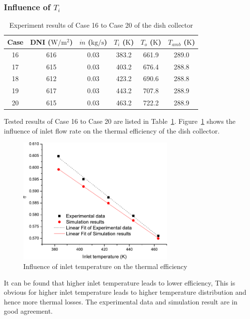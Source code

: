 \subsubsection{Influence of $T_i$}

\begin{table}[htbp]\footnotesize
	\caption{Experiment results of Case 16 to Case 20 of the dish collector}
	\begin{center}
	\begin{tabular}{cccccc}
		\toprule
		Case	& DNI ($\mathrm{W/m^2}$)	&	$\dot{m}$ ($\mathrm{kg/s}$)			&	$T_i$ ($\mathrm{K}$)	&	$T_o$ ($\mathrm{K}$)		&	$T_{amb}$ ($\mathrm{K}$)\\
		\midrule
		16	&	616	&	0.03	&	383.2	&	661.9	&	289.0\\
		17	&	615	&	0.03	&	403.2	&	676.4	&	288.8\\
		18	&	612	&	0.03	&	423.2	&	690.6	&	288.8	\\
		19	&	617	&	0.03	&	443.2	&	707.8	&	288.9\\
		20	&	615	&	0.03	&	463.2	&	722.2	&	288.9\\
		\bottomrule
	\end{tabular}
	\end{center}
	\label{tab:ResultOfDish3}
\end{table}
Tested results of Case 16 to Case 20 are listed in Table~\ref{tab:ResultOfDish3}.
Figure~\ref{fig:T_i-eta-dish} shows the influence of inlet flow rate on the thermal efficiency of the dish collector.
\begin{figure}[!ht]
\centering
\includegraphics[width=0.7\textwidth]{fig/T_i-eta-dish}
\caption{Influence of inlet temperature on the thermal efficiency}
\label{fig:T_i-eta-dish}
\end{figure}

It can be found that higher inlet temperature leads to lower efficiency, This is obvious for higher inlet temperature leads to higher temperature distribution and hence more thermal losses. The experimental data and simulation result are in good agreement.

